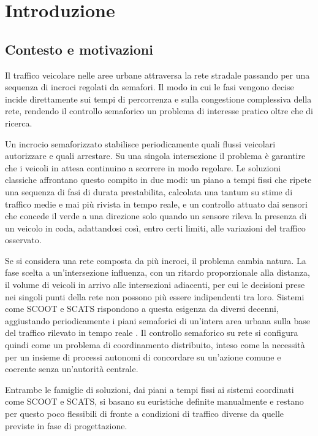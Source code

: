\chapter{Introduzione}
\label{cap:introduzione}

\section{Contesto e motivazioni}
\label{sec:intro-motivazioni}

Il traffico veicolare nelle aree urbane attraversa la rete stradale
passando per una sequenza di incroci regolati da semafori. Il modo in cui
le fasi vengono decise incide direttamente sui tempi di percorrenza e
sulla congestione complessiva della rete, rendendo il controllo
semaforico un problema di interesse pratico oltre che di ricerca.

Un incrocio semaforizzato stabilisce periodicamente quali flussi
veicolari autorizzare e quali arrestare.
Su una singola intersezione il problema è garantire che i veicoli in attesa continuino a scorrere in modo regolare.
Le soluzioni classiche affrontano questo compito in due modi: un piano a
tempi fissi che ripete una sequenza di fasi di durata prestabilita, calcolata
una tantum su stime di traffico medie e mai più rivista in tempo reale, e un
controllo attuato dai sensori che concede il verde a una direzione solo
quando un sensore rileva la presenza di un veicolo in coda, adattandosi
così, entro certi limiti, alle variazioni del traffico osservato.

Se si considera una rete composta da più incroci, il problema cambia
natura. La fase scelta a un'intersezione influenza, con un ritardo
proporzionale alla distanza, il volume di veicoli in arrivo alle
intersezioni adiacenti, per cui le decisioni prese nei singoli punti della
rete non possono più essere indipendenti tra loro. Sistemi come SCOOT e
SCATS rispondono a questa esigenza da diversi decenni, aggiustando
periodicamente i piani semaforici di un'intera area urbana sulla base del
traffico rilevato in tempo reale \citep{wei2020tscsurvey}. Il controllo
semaforico su rete si configura quindi come un problema di coordinamento
distribuito, inteso come la necessità per un insieme di processi autonomi
di concordare su un'azione comune e coerente senza un'autorità centrale.

Entrambe le famiglie di soluzioni, dai piani a tempi fissi ai sistemi
coordinati come SCOOT e SCATS, si basano su euristiche definite
manualmente e restano per questo poco flessibili di fronte a condizioni
di traffico diverse da quelle previste in fase di progettazione.

